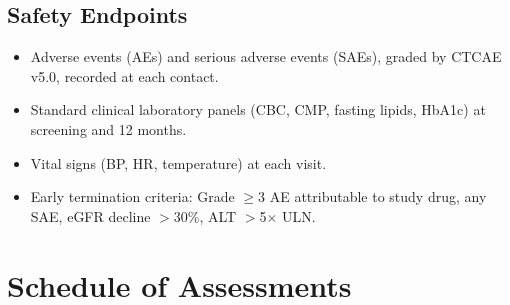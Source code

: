 \documentclass[11pt,a4paper]{article}
\begin{document}
\subsection{Safety Endpoints}

\begin{itemize}[nosep]
  \item Adverse events (AEs) and serious adverse events (SAEs), graded by CTCAE v5.0, recorded at each contact.
  \item Standard clinical laboratory panels (CBC, CMP, fasting lipids, HbA1c) at screening and 12 months.
  \item Vital signs (BP, HR, temperature) at each visit.
  \item Early termination criteria: Grade $\geq$3 AE attributable to study drug, any SAE, eGFR decline $>$30\%, ALT $>$5$\times$ ULN.
\end{itemize}

\section{Schedule of Assessments}
\end{document}
